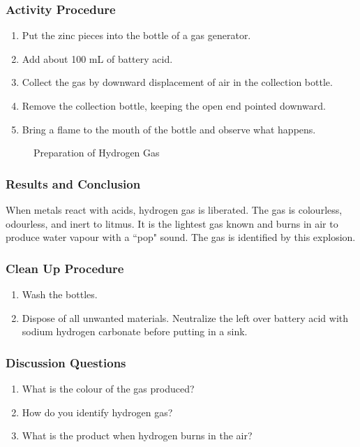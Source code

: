 \subsubsection*{Activity Procedure}
\begin{enumerate}
\item{Put the zinc pieces into the bottle of a gas generator.}
\item{Add about 100 mL of battery acid.}
\item{Collect the gas by downward displacement of air in the collection bottle.}
\item{Remove the collection bottle, keeping the open end pointed downward.}
\item{Bring a flame to the mouth of the bottle and observe what happens.}
\end{enumerate}

\begin{figure}[h]
\begin{center}
\def\svgwidth{220pt}

\caption{Preparation of Hydrogen Gas}
\end{center}
\end{figure}

\subsubsection*{Results and Conclusion}
When metals react with acids, hydrogen gas is liberated. The gas is colourless, odourless, and inert to litmus. It is the lightest gas known and burns in air to produce water vapour with a ``pop" sound. The gas is identified by this explosion.

\subsubsection*{Clean Up Procedure}
\begin{enumerate}
\item{Wash the bottles.}
\item{Dispose of all unwanted materials. Neutralize the left over battery acid with sodium hydrogen carbonate before putting in a sink.}
\end{enumerate}

\subsubsection*{Discussion Questions}
\begin{enumerate}
\item{What is the colour of the gas produced?}
\item{How do you identify hydrogen gas?}
\item{What is the product when hydrogen burns in the air?}
\end{enumerate}


